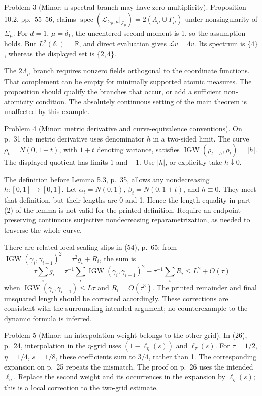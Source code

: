 \documentclass[10pt]{article}
\begin{document}
Problem 3 (Minor: a spectral branch may have zero multiplicity).  Proposition 10.2, pp. 55–56, claims \(\mathop{\mathrm{spec}}(\mathcal L_{\Sigma_\mu,\mu}|_{\mathcal I_\mu})
 =2(\Lambda_\mu\cup\Gamma_\mu)\) under nonsingularity of \(\Sigma_\mu\). For \(d=1\), \(\mu=\delta_1\), the uncentered second moment is 1, so the assumption holds. But \(L^2(\delta_1)=\mathbb R\), and direct evaluation gives \(\mathcal L v=4v\). Its spectrum is \(\{4\}\), whereas the displayed set is \(\{2,4\}\).\par
The \(2\Lambda_\mu\) branch requires nonzero fields orthogonal to the coordinate functions. That complement can be empty for minimally supported atomic measures. The proposition should qualify the branches that occur, or add a sufficient non-atomicity condition. The absolutely continuous setting of the main theorem is unaffected by this example.\par
Problem 4 (Minor: metric derivative and curve-equivalence conventions).  On p. 31 the metric derivative uses denominator \(h\) in a two-sided limit. The curve \(\rho_t=N(0,1+t)\), with \(1+t\) denoting variance, satisfies \(\mathop{\mathrm{IGW}}(\rho_{t+h},\rho_t)=|h|\). The displayed quotient has limits \(1\) and \(-1\). Use \(|h|\), or explicitly take \(h\downarrow0\).\par
The definition before Lemma 5.3, p. 35, allows any nondecreasing \(h:[0,1]\to[0,1]\). Let \(\alpha_t=N(0,1)\), \(\beta_t=N(0,1+t)\), and \(h\equiv0\). They meet that definition, but their lengths are 0 and 1. Hence the length equality in part (2) of the lemma is not valid for the printed definition. Require an endpoint-preserving continuous surjective nondecreasing reparametrization, as needed to traverse the whole curve.\par
There are related local scaling slips in (54), p. 65: from \(\mathop{\mathrm{IGW}}(\gamma_i,\gamma_{i-1})^2=\tau^2g_i+R_i\), the sum is \[\tau\sum_i g_i
   =\tau^{-1}\sum_i\mathop{\mathrm{IGW}}(\gamma_i,\gamma_{i-1})^2
      -\tau^{-1}\sum_i R_i
   \le L^2+O(\tau)\] when \(\mathop{\mathrm{IGW}}(\gamma_i,\gamma_{i-1})\le L\tau\) and \(R_i=O(\tau^3)\). The printed remainder and final unsquared length should be corrected accordingly. These corrections are consistent with the surrounding intended argument; no counterexample to the dynamic formula is inferred.\par
Problem 5 (Minor: an interpolation weight belongs to the other grid).  In (26), p. 24, interpolation in the \(\eta\)-grid uses \((1-\ell_\eta(s))\) and \(\ell_\tau(s)\). For \(\tau=1/2\), \(\eta=1/4\), \(s=1/8\), these coefficients sum to \(3/4\), rather than 1. The corresponding expansion on p. 25 repeats the mismatch. The proof on p. 26 uses the intended \(\ell_\eta\). Replace the second weight and its occurrences in the expansion by \(\ell_\eta(s)\); this is a local correction to the two-grid estimate.\par
\end{document}
